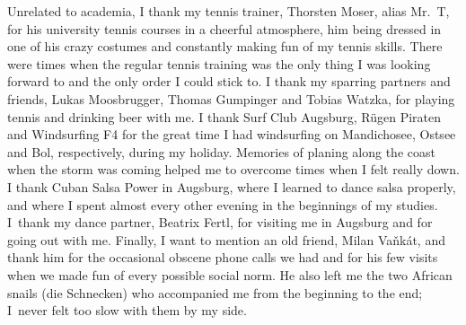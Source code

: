 \documentclass[\MainFolder/Text.tex]{subfiles}
\begin{document}
Unrelated to academia, I thank my tennis trainer, Thorsten Moser, alias Mr.~T, for his university tennis courses in a cheerful atmosphere, him being dressed in one of his crazy costumes and constantly making fun of my tennis skills. There were times when the regular tennis training was the only thing I was looking forward to and the only order I could stick to. I thank my sparring partners and friends, Lukas Moosbrugger, Thomas Gumpinger and Tobias Watzka, for playing tennis and drinking beer with me. I thank Surf Club Augsburg, R\"ugen Piraten and Windsurfing F4 for the great time I had windsurfing on Mandichosee, Ostsee and Bol, respectively, during my holiday. Memories of planing along the coast when the storm was coming helped me to overcome times when I felt really down. I thank Cuban Salsa Power in Augsburg, where I learned to dance salsa properly, and where I spent almost every other evening in the beginnings of my studies. I~thank my dance partner, Beatrix Fertl, for visiting me in Augsburg and for going out with me. Finally, I want to mention an old friend, Milan Va\v nk\'at, and thank him for the occasional obscene phone calls we had and for his few visits when we made fun of every possible social norm. He also left me the two African snails (die Schnecken) who accompanied me from the beginning to the end; I~never felt too slow with them by my side.


%

\end{document}
